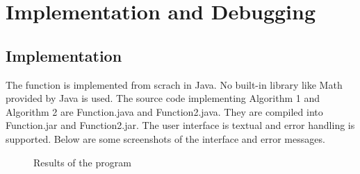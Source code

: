 \documentclass{article}
\begin{document}
\newpage
{}
\section{Implementation and Debugging}
\subsection{Implementation}
The function is implemented from scrach in Java. No built-in library like Math provided by Java is used. The source code implementing Algorithm 1 and Algorithm 2 are Function.java and Function2.java. They are compiled into Function.jar and Function2.jar. The user interface is textual and error handling is supported. Below are some screenshots of the interface and error messages.
\begin{figure}[H]
\centering
{}
\caption{Results of the program}
\label{Fig.main3}
\end{figure}

\newpage
\end{document}
